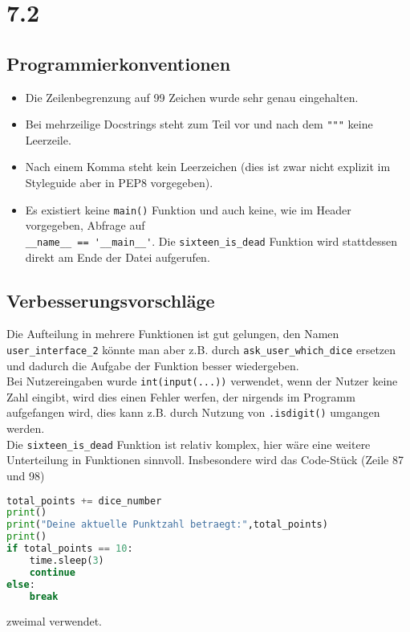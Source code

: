 \section*{7.2}

\subsection*{Programmierkonventionen}
\begin{itemize}
\item Die Zeilenbegrenzung auf 99 Zeichen wurde sehr genau eingehalten.
\item Bei mehrzeilige Docstrings steht zum Teil vor und nach dem \verb+"""+ keine Leerzeile.
\item Nach einem Komma steht kein Leerzeichen (dies ist zwar nicht explizit im Styleguide aber in PEP8 vorgegeben).
\item Es existiert keine \verb+main()+ Funktion und auch keine, wie im Header vorgegeben, Abfrage auf\\
\verb+__name__ == '__main__'+. Die \verb+sixteen_is_dead+ Funktion wird stattdessen direkt am Ende der Datei aufgerufen.
\end{itemize}

\subsection*{Verbesserungsvorschläge}

Die Aufteilung in mehrere Funktionen ist gut gelungen, den Namen \verb+user_interface_2+ könnte man aber z.B. durch \verb+ask_user_which_dice+ ersetzen und dadurch die Aufgabe der Funktion besser wiedergeben.\\

Bei Nutzereingaben wurde \verb+int(input(...))+ verwendet, wenn der Nutzer keine Zahl eingibt, wird dies einen Fehler werfen, der nirgends im Programm aufgefangen wird, dies kann z.B. durch Nutzung von \verb+.isdigit()+ umgangen werden.\\

Die \verb+sixteen_is_dead+ Funktion ist relativ komplex, hier wäre eine weitere Unterteilung in Funktionen sinnvoll. Insbesondere wird das Code-Stück (Zeile 87 und 98)
\begin{lstlisting}[language=Python]
total_points += dice_number
print()
print("Deine aktuelle Punktzahl betraegt:",total_points)
print()
if total_points == 10:
    time.sleep(3)
    continue
else:
    break
\end{lstlisting}
zweimal verwendet.\\

